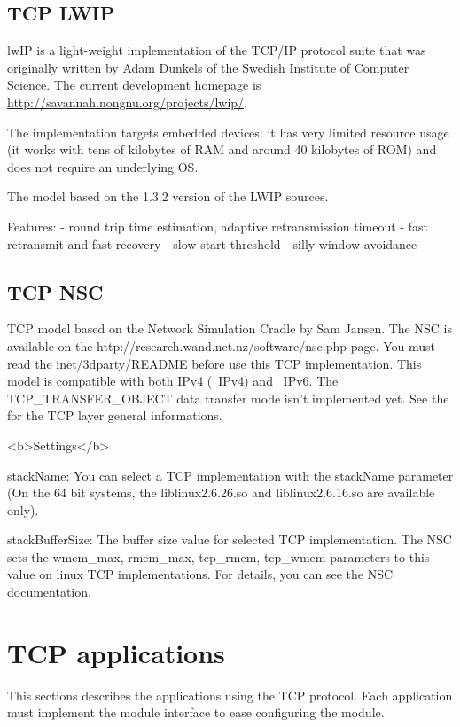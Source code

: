 \subsection{TCP LWIP}

lwIP is a light-weight implementation of the TCP/IP protocol suite
that was originally written by Adam Dunkels of the Swedish Institute of
Computer Science. The current development homepage is
\url{http://savannah.nongnu.org/projects/lwip/}.

The implementation targets embedded devices: it has
very limited resource usage (it works with tens of kilobytes of RAM and
around 40 kilobytes of ROM) and does not require an underlying OS.

The  model based on the 1.3.2 version of the LWIP sources.

Features:
- round trip time estimation, adaptive retransmission timeout
- fast retransmit and fast recovery
- slow start threshold
- silly window avoidance



\subsection{TCP NSC}

TCP model based on the Network Simulation Cradle by Sam Jansen.
The NSC is available on the http://research.wand.net.nz/software/nsc.php page.
You must read the inet/3dparty/README before use this TCP implementation.
This model is compatible with both IPv4 (~IPv4) and ~IPv6.
The TCP\_TRANSFER\_OBJECT data transfer mode isn't implemented yet.
See the  for the TCP layer general informations.

<b>Settings</b>

stackName: You can select a TCP implementation with the stackName parameter
(On the 64 bit systems, the liblinux2.6.26.so and liblinux2.6.16.so are available only).

stackBufferSize: The buffer size value for selected TCP implementation.
The NSC sets the wmem\_max, rmem\_max, tcp\_rmem, tcp\_wmem parameters to this value
on linux TCP implementations. For details, you can see the NSC documentation.


\section{TCP applications}

This sections describes the applications using the TCP protocol.
Each application must implement the  module interface
to ease configuring the  module.

